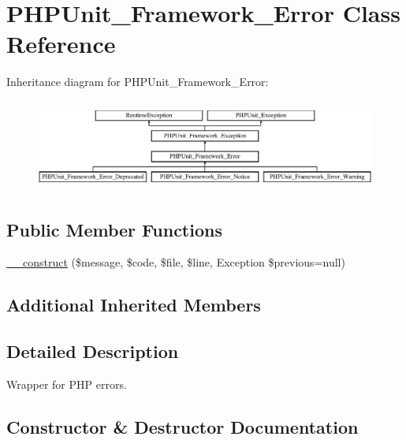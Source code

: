 \hypertarget{class_p_h_p_unit___framework___error}{}\section{P\+H\+P\+Unit\+\_\+\+Framework\+\_\+\+Error Class Reference}
\label{class_p_h_p_unit___framework___error}
Inheritance diagram for P\+H\+P\+Unit\+\_\+\+Framework\+\_\+\+Error\+:\begin{figure}[H]
\begin{center}
\leavevmode
\includegraphics[height=3.035230cm]{class_p_h_p_unit___framework___error}
\end{center}
\end{figure}
\subsection*{Public Member Functions}
\begin{DoxyCompactItemize}
\item 
\mbox{\hyperlink{class_p_h_p_unit___framework___error_aac1fe1fc64ec6221aca77ad4af62476a}{\+\_\+\+\_\+construct}} (\$message, \$code, \$file, \$line, Exception \$previous=null)
\end{DoxyCompactItemize}
\subsection*{Additional Inherited Members}


\subsection{Detailed Description}
Wrapper for P\+HP errors. 

\subsection{Constructor \& Destructor Documentation}
\mbox{\label{class_p_h_p_unit___framework___error_aac1fe1fc64ec6221aca77ad4af62476a}} 

